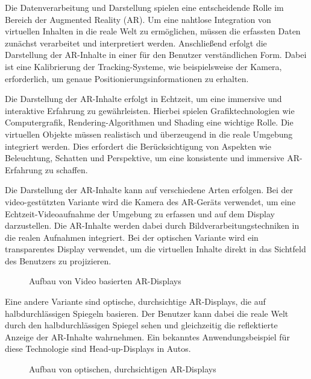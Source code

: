 Die Datenverarbeitung und Darstellung spielen eine entscheidende Rolle im
Bereich der Augmented Reality (AR). Um eine nahtlose Integration von virtuellen
Inhalten in die reale Welt zu ermöglichen, müssen die erfassten Daten zunächst
verarbeitet und interpretiert werden. Anschließend erfolgt die Darstellung der
AR-Inhalte in einer für den Benutzer verständlichen Form. Dabei ist eine
Kalibrierung der Tracking-Systeme, wie beispielsweise der Kamera, erforderlich,
um genaue Positionierungsinformationen zu erhalten.

Die Darstellung der AR-Inhalte erfolgt in Echtzeit, um eine immersive und
interaktive Erfahrung zu gewährleisten. Hierbei spielen Grafiktechnologien wie
Computergrafik, Rendering-Algorithmen und Shading eine wichtige Rolle. Die
virtuellen Objekte müssen realistisch und überzeugend in die reale Umgebung
integriert werden. Dies erfordert die Berücksichtigung von Aspekten wie
Beleuchtung, Schatten und Perspektive, um eine konsistente und immersive
AR-Erfahrung zu schaffen.

Die Darstellung der AR-Inhalte kann auf verschiedene Arten erfolgen. Bei der
video-gestützten Variante wird die Kamera des AR-Geräts verwendet, um eine
Echtzeit-Videoaufnahme der Umgebung zu erfassen und auf dem Display
darzustellen. Die AR-Inhalte werden dabei durch Bildverarbeitungstechniken in
die realen Aufnahmen integriert. Bei der optischen Variante wird ein
transparentes Display verwendet, um die virtuellen Inhalte direkt in das
Sichtfeld des Benutzers zu projizieren.

\begin{figure}
      \centering
      
      \caption{Aufbau von Video basierten AR-Displays \cite{billinghurst2015survey}}
      \label{fig:VBAR}
\end{figure}

Eine andere Variante sind optische, durchsichtige AR-Displays, die auf
halbdurchlässigen Spiegeln basieren. Der Benutzer kann dabei die reale Welt
durch den halbdurchlässigen Spiegel sehen und gleichzeitig die reflektierte
Anzeige der AR-Inhalte wahrnehmen. Ein bekanntes Anwendungsbeispiel für diese
Technologie sind Head-up-Displays in Autos.

\begin{figure}
      \centering
      
      \caption{Aufbau von optischen, durchsichtigen AR-Displays \cite{billinghurst2015survey}}
      \label{fig:OSTAR}
  \end{figure}

